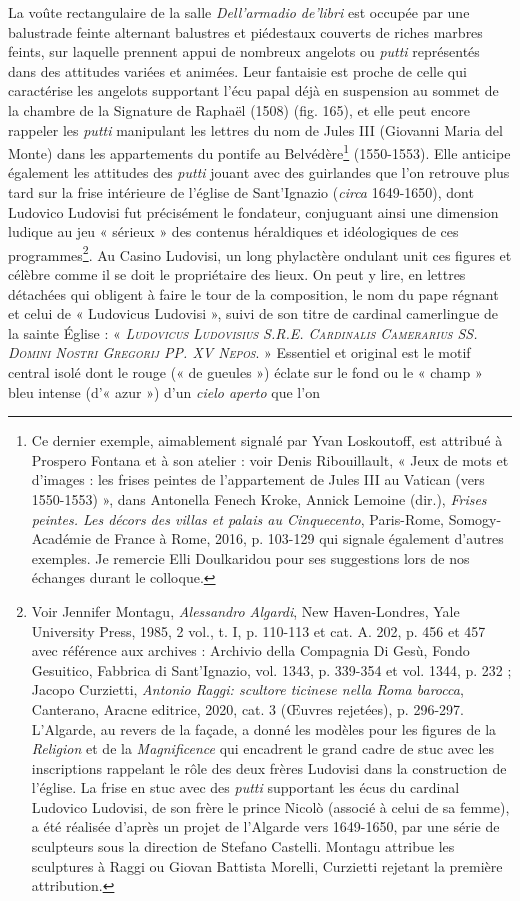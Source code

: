 \documentclass[12pt,twoside,openany]{book}
\begin{document}
La voûte rectangulaire de la salle \textit{Dell’armadio de’libri} est occupée par une balustrade feinte alternant balustres et piédestaux couverts de riches marbres feints, sur laquelle prennent appui de nombreux angelots ou \textit{putti} représentés dans des attitudes variées et animées. Leur fantaisie est proche de celle qui caractérise les angelots supportant l’écu papal déjà en suspension au sommet de la chambre de la Signature de Raphaël (1508) (fig. 165), et elle peut encore rappeler les \textit{putti} manipulant les lettres du nom de Jules III (Giovanni Maria del Monte) dans les appartements du pontife au Belvédère\footnote{Ce dernier exemple, aimablement signalé par Yvan Loskoutoff, est attribué à Prospero Fontana et à son atelier : voir Denis Ribouillault, « Jeux de mots et d’images : les frises peintes de l’appartement de Jules III au Vatican (vers 1550-1553) », dans Antonella Fenech Kroke, Annick Lemoine (dir.), \textit{Frises peintes. Les décors des villas et palais au Cinquecento}, Paris-Rome, Somogy-Académie de France à Rome, 2016, p. 103-129 qui signale également d’autres exemples. Je remercie Elli Doulkaridou pour ses suggestions lors de nos échanges durant le colloque.} (1550-1553). Elle anticipe également les attitudes des \textit{putti} jouant avec des guirlandes que l’on retrouve plus tard sur la frise intérieure de l’église de Sant’Ignazio (\textit{circa} 1649-1650), dont Ludovico Ludovisi fut précisément le fondateur, conjuguant ainsi une dimension ludique au jeu « sérieux » des contenus héraldiques et idéologiques de ces programmes\footnote{Voir Jennifer Montagu, \textit{Alessandro Algardi}, New Haven-Londres, Yale University Press, 1985, 2 vol., t. I, p. 110-113 et cat. A. 202, p. 456 et 457 avec référence aux archives : Archivio della Compagnia Di Gesù, Fondo Gesuitico, Fabbrica di Sant’Ignazio, vol. 1343, p. 339-354 et vol. 1344, p. 232 ; Jacopo Curzietti, \textit{Antonio Raggi: scultore ticinese nella Roma barocca}, Canterano, Aracne editrice, 2020, cat. 3 (Œuvres rejetées), p. 296-297. L’Algarde, au revers de la façade, a donné les modèles pour les figures de la \textit{Religion} et de la \textit{Magnificence} qui encadrent le grand cadre de stuc avec les inscriptions rappelant le rôle des deux frères Ludovisi dans la construction de l’église. La frise en stuc avec des \textit{putti} supportant les écus du cardinal Ludovico Ludovisi, de son frère le prince Nicolò (associé à celui de sa femme), a été réalisée d’après un projet de l’Algarde vers 1649-1650, par une série de sculpteurs sous la direction de Stefano Castelli. Montagu attribue les sculptures à Raggi ou Giovan Battista Morelli, Curzietti rejetant la première attribution.}. Au Casino Ludovisi, un long phylactère ondulant unit ces figures et célèbre comme il se doit le propriétaire des lieux. On peut y lire, en lettres détachées qui obligent à faire le tour de la composition, le nom du pape régnant et celui de « Ludovicus Ludovisi », suivi de son titre de cardinal camerlingue de la sainte Église : « \textit{\textsc{Ludovicus Ludovisius S.R.E. Cardinalis Camerarius SS. Domini Nostri Gregorij PP. XV Nepos}}. » Essentiel et original est le motif central isolé dont le rouge (« de gueules ») éclate sur le fond ou le « champ » bleu intense (d’« azur ») d’un \textit{cielo aperto} que l’on 
\end{document}

